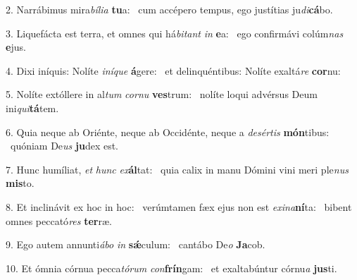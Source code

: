 2. Narrábimus mira\textit{bí}\textit{li}\textit{a} \textbf{tu}a: \ast\  cum accépero tempus, ego justítias ju\textit{di}\textbf{cá}bo.\

3. Liquefácta est terra, et omnes qui há\textit{bi}\textit{tant} \textit{in} \textbf{e}a: \ast\  ego confirmávi colúm\textit{nas} \textbf{e}jus.\

4. Dixi iníquis: Nolíte \textit{in}\textit{í}\textit{que} \textbf{á}gere: \ast\  et delinquéntibus: Nolíte exaltá\textit{re} \textbf{cor}nu:\

5. Nolíte extóllere in al\textit{tum} \textit{cor}\textit{nu} \textbf{ves}trum: \ast\  nolíte loqui advérsus Deum ini\textit{qui}\textbf{tá}tem.\

6. Quia neque ab Oriénte, neque ab Occidénte, neque a \textit{de}\textit{sér}\textit{tis} \textbf{món}tibus: \ast\  quóniam De\textit{us} \textbf{ju}dex est.\

7. Hunc humíliat, \textit{et} \textit{hunc} \textit{ex}\textbf{ál}tat: \ast\  quia calix in manu Dómini vini meri ple\textit{nus} \textbf{mis}to.\

8. Et inclinávit ex hoc in hoc: \dag\  verúmtamen fæx ejus non est \textit{ex}\textit{i}\textit{na}\textbf{ní}ta: \ast\  bibent omnes peccató\textit{res} \textbf{ter}ræ.\

9. Ego autem annunti\textit{á}\textit{bo} \textit{in} \textbf{sǽ}culum: \ast\  cantábo De\textit{o} \textbf{Ja}cob.\

10. Et ómnia córnua pecca\textit{tó}\textit{rum} \textit{con}\textbf{frín}gam: \ast\  et exaltabúntur córnu\textit{a} \textbf{jus}ti.\

